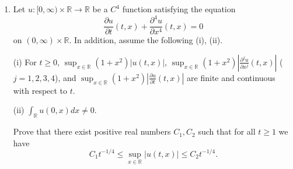 \documentclass{article}
\begin{document}
\begin{enumerate}[label=\fbox{\arabic*}]
        (ii) Letting $a_n = \sup_{k \ge 1} \|P_{n+k} T P_k\|$, we have $\sum_{n \in \mathbb{Z}} a_n < \infty$.
        
        Here for an operator $A$, we denote by $\|A\|$ the operator norm of $A$.
        For $n \in \mathbb{Z}$, we define $S_n : H \to H$ by
        \[
          S_n x = \sum_{k=1}^\infty P_{n+k} T P_k x, \quad x \in H.
        \]
        \begin{enumerate}[label=(\arabic*)]
          \item Show that $\|S_n\| \le a_n$ holds.
          \item Show that $S_n$ is a compact operator.
          \item Show that $T$ is a compact operator.
        \end{enumerate}

  \item %
        Let $u: [0, \infty) \times \mathbb{R} \to \mathbb{R}$ be a $C^4$ function satisfying the equation
        \[
          \frac{\partial u}{\partial t}(t, x) + \frac{\partial^4 u}{\partial x^4}(t, x) = 0
        \]
        on $(0, \infty) \times \mathbb{R}$. In addition, assume the following (i), (ii).
        
        (i) For $t \ge 0$, $\sup_{x \in \mathbb{R}} (1+x^2) |u(t, x)|$, $\sup_{x \in \mathbb{R}} (1+x^2) \left|\frac{\partial^j u}{\partial x^j}(t, x)\right|$ ($j=1,2,3,4$), and $\sup_{x \in \mathbb{R}} (1+x^2) \left|\frac{\partial u}{\partial t}(t, x)\right|$ are finite and continuous with respect to $t$.
        
        (ii) $\int_{\mathbb{R}} u(0, x) dx \neq 0$.
        
        Prove that there exist positive real numbers $C_1, C_2$ such that for all $t \ge 1$ we have
        \[
          C_1 t^{-1/4} \le \sup_{x \in \mathbb{R}} |u(t, x)| \le C_2 t^{-1/4}.
        \]


\end{enumerate}
\end{document}

